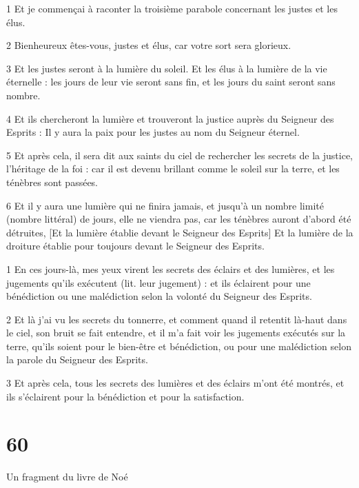 
\par 1 Et je commençai à raconter la troisième parabole concernant les justes et les élus.
\par 2 Bienheureux êtes-vous, justes et élus, car votre sort sera glorieux.
\par 3 Et les justes seront à la lumière du soleil. Et les élus à la lumière de la vie éternelle : les jours de leur vie seront sans fin, et les jours du saint seront sans nombre.
\par 4 Et ils chercheront la lumière et trouveront la justice auprès du Seigneur des Esprits : Il y aura la paix pour les justes au nom du Seigneur éternel.
\par 5 Et après cela, il sera dit aux saints du ciel de rechercher les secrets de la justice, l'héritage de la foi : car il est devenu brillant comme le soleil sur la terre, et les ténèbres sont passées.
\par 6 Et il y aura une lumière qui ne finira jamais, et jusqu'à un nombre limité (nombre littéral) de jours, elle ne viendra pas, car les ténèbres auront d'abord été détruites, [Et la lumière établie devant le Seigneur des Esprits] Et la lumière de la droiture établie pour toujours devant le Seigneur des Esprits.


\par 1 En ces jours-là, mes yeux virent les secrets des éclairs et des lumières, et les jugements qu'ils exécutent (lit. leur jugement) : et ils éclairent pour une bénédiction ou une malédiction selon la volonté du Seigneur des Esprits.
\par 2 Et là j'ai vu les secrets du tonnerre, et comment quand il retentit là-haut dans le ciel, son bruit se fait entendre, et il m'a fait voir les jugements exécutés sur la terre, qu'ils soient pour le bien-être et bénédiction, ou pour une malédiction selon la parole du Seigneur des Esprits.
\par 3 Et après cela, tous les secrets des lumières et des éclairs m'ont été montrés, et ils s'éclairent pour la bénédiction et pour la satisfaction.

\chapter{60} Un fragment du livre de Noé

